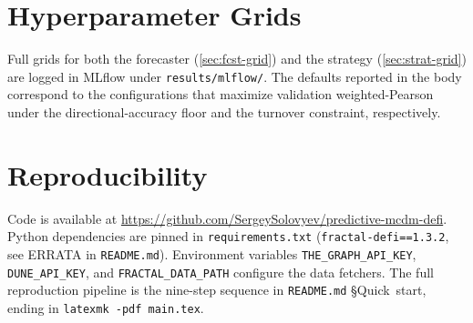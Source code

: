 \documentclass[11pt,a4paper]{article}
\begin{document}
\section{Hyperparameter Grids}
\label{app:grids}

Full grids for both the forecaster (\cref{sec:fcst-grid}) and the
strategy (\cref{sec:strat-grid}) are logged in MLflow under
\texttt{results/mlflow/}. The defaults reported in the body
correspond to the configurations that maximize validation
weighted-Pearson under the directional-accuracy floor and the
turnover constraint, respectively.

\section{Reproducibility}
\label{app:repro}

Code is available at
\url{https://github.com/SergeySolovyev/predictive-mcdm-defi}.
Python dependencies are pinned in \texttt{requirements.txt}
(\texttt{fractal-defi==1.3.2}, see ERRATA in \texttt{README.md}).
Environment variables \texttt{THE\_GRAPH\_API\_KEY},
\texttt{DUNE\_API\_KEY}, and \texttt{FRACTAL\_DATA\_PATH} configure
the data fetchers. The full reproduction pipeline is the
nine-step sequence in \texttt{README.md} \S Quick~start, ending in
\texttt{latexmk -pdf main.tex}.

\printbibliography[heading=bibintoc]
\end{document}
